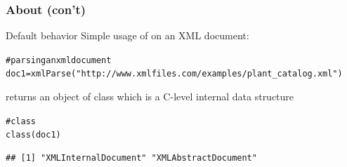 \documentclass{beamer}\usepackage[]{graphicx}\usepackage[]{color}
\makeatletter
\newcommand{\hlstr}[1]{\textcolor[rgb]{0.063,0.58,0.627}{#1}}%
\newcommand{\hlcom}[1]{\textcolor[rgb]{0.588,0.588,0.588}{#1}}%
\newcommand{\hlstd}[1]{\textcolor[rgb]{0.196,0.196,0.196}{#1}}%
\newcommand{\hlkwb}[1]{\textcolor[rgb]{0.627,0,0.314}{#1}}%
\newcommand{\hlkwd}[1]{\textcolor[rgb]{0.78,0.227,0.412}{#1}}%
\newenvironment{kframe}{%
 \def\at@end@of@kframe{}%
 \ifinner\ifhmode%
  \def\at@end@of@kframe{\end{minipage}}%
  \begin{minipage}{\columnwidth}%
 \fi\fi%
 \def\FrameCommand##1{\hskip\@totalleftmargin \hskip-\fboxsep
 \colorbox{shadecolor}{##1}\hskip-\fboxsep
     \hskip-\linewidth \hskip-\@totalleftmargin \hskip\columnwidth}%
 \MakeFramed {\advance\hsize-\width
   \@totalleftmargin\z@ \linewidth\hsize
   \@setminipage}}%
 {\par\unskip\endMakeFramed%
 \at@end@of@kframe}
\newenvironment{knitrout}{}{} %
\makeatother
\begin{document}

\begin{frame}[fragile]
\frametitle{About  (con't)}

\begin{block}{Default behavior}
Simple usage of  on an XML document:
\begin{knitrout}\tiny
{}\color{fgcolor}\begin{kframe}
\begin{alltt}
\hlcom{# parsing an xml document}
\hlstd{doc1} \hlkwb{=} \hlkwd{xmlParse}\hlstd{(}\hlstr{"http://www.xmlfiles.com/examples/plant_catalog.xml"}\hlstd{)}
\end{alltt}
\end{kframe}
\end{knitrout}

 returns an object of class  which is a C-level internal data structure

\begin{knitrout}\tiny
{}\color{fgcolor}\begin{kframe}
\begin{alltt}
\hlcom{# class }
\hlkwd{class}\hlstd{(doc1)}
\end{alltt}
\begin{verbatim}
## [1] "XMLInternalDocument" "XMLAbstractDocument"
\end{verbatim}
\end{kframe}
\end{knitrout}
\end{block}

\end{frame}

\end{document}
